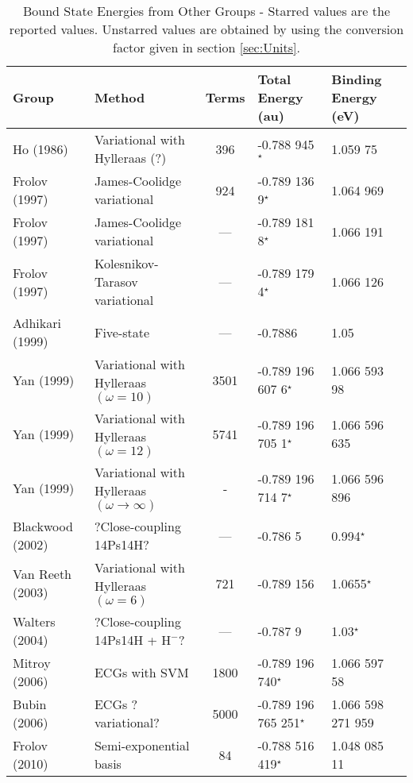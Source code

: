 \documentclass[Dissertation.tex]{subfiles}
\begin{document}
\begin{table}[H]
\begin{center}
\begin{tabular}{l l c l l}
\toprule
Group & Method & Terms & Total Energy (au) & Binding Energy (eV)\\
\midrule
Ho (1986) \cite{Ho1986} & Variational with Hylleraas (?) & 396 & -0.788 945$^\star$ & 1.059 75 \\
Frolov (1997) \cite{Frolov1997a} & James-Coolidge variational & 924 & -0.789 136 9$^\star$ & 1.064 969 \\
Frolov (1997) \cite{Frolov1997a} & James-Coolidge variational & --- & -0.789 181 8$^\star$ & 1.066 191 \\
Frolov (1997) \cite{Frolov1997b} & Kolesnikov-Tarasov variational & --- & -0.789 179 4$^\star$ & 1.066 126 \\
Adhikari (1999) \cite{Adhikari1999} & Five-state & --- & -0.7886 & 1.05 \\
Yan (1999) \cite{Yan1999} & Variational with Hylleraas $(\omega = 10)$ & 3501 & -0.789 196 607 6$^\star$ & 1.066 593 98 \\
Yan (1999) \cite{Yan1999} & Variational with Hylleraas $(\omega = 12)$ & 5741 & -0.789 196 705 1$^\star$ & 1.066 596 635 \\
Yan (1999) \cite{Yan1999} & Variational with Hylleraas $(\omega \rightarrow \infty)$ & - & -0.789 196 714 7$^\star$ & 1.066 596 896 \\
Blackwood (2002) \cite{Blackwood2002} & ?Close-coupling 14Ps14H? & --- & -0.786 5 & 0.994$^\star$ \\
Van Reeth (2003) \cite{VanReeth2003} & Variational with Hylleraas $(\omega = 6)$ & 721 & -0.789 156 & 1.0655$^\star$ \\
Walters (2004) \cite{Walters2004} & ?Close-coupling 14Ps14H + $\text{H}^-$? & --- & -0.787 9 & 1.03$^\star$\\
Mitroy (2006) \cite{Mitroy2006} & ECGs with SVM & 1800 & -0.789 196 740$^\star$ & 1.066 597 58 \\
Bubin (2006) \cite{Bubin2006} & ECGs ?variational? & 5000 & -0.789 196 765 251$^\star$ & 1.066 598 271 959 \\
Frolov (2010) \cite{Frolov2010} & Semi-exponential basis & 84 & -0.788 516 419$^\star$ & 1.048 085 11 \\
\bottomrule
\end{tabular}
\caption{Bound State Energies from Other Groups - Starred values are the reported values.  Unstarred values are obtained by using the conversion factor given in section \ref{sec:Units}.}
\label{tab:BoundEnergyOther}
\end{center}
\end{table}
\end{document}
